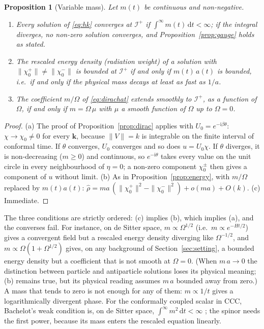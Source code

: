 \documentclass[11pt,a4paper]{article}
\newtheorem{proposition}{Proposition}
\theoremstyle{definition}
\newcommand{\scri}{\mathscr{I}^{+}}
\newcommand{\dd}{\mathrm{d}}
\newcommand{\ii}{\mathrm{i}}
\begin{document}
\begin{proposition}[Variable mass]
\label{prop:varmass}
Let $m(t)$ be continuous and non-negative.
\begin{enumerate}[label=(\alph*)]
\item Every solution of \eqref{eq:hk} converges at $\scri$ if $\int^{\infty}m(t)\,\dd t<\infty$; if the integral diverges, no non-zero solution converges, and Proposition~\ref{prop:gauge} holds as stated.
\item The rescaled energy density (radiation weight) of a solution with $\|\chi_{0}^{+}\|\neq\|\chi_{0}^{-}\|$ is bounded at $\scri$ if and only if $m(t)\,a(t)$ is bounded, i.e.\ if and only if the physical mass decays at least as fast as $1/a$.
\item The coefficient $m/\Omega$ of \eqref{eq:dirachat} extends smoothly to $\scri$, as a function of $\Omega$, if and only if $m=\Omega\,\mu$ with $\mu$ a smooth function of $\Omega$ up to $\Omega=0$.
\end{enumerate}
\end{proposition}
\begin{proof}
(a) The proof of Proposition~\ref{prop:dirac} applies with $U_{0}=e^{-\ii\beta\theta}$: $\chi\to\chi_{0}\neq0$ for every $\mathbf{k}$, because $\|V\|=k$ is integrable on the finite interval of conformal time. If $\theta$ converges, $U_{0}$ converges and so does $u=U_{0}\chi$. If $\theta$ diverges, it is non-decreasing ($m\geq0$) and continuous, so $e^{-\ii\theta}$ takes every value on the unit circle in every neighbourhood of $\eta=0$; a non-zero component $\chi_{0}^{\pm}$ then gives a component of $u$ without limit. (b) As in Proposition~\ref{prop:energy}, with $m/\Omega$ replaced by $m(t)a(t)$: $\hat\rho=m a\,(\|\chi_{0}^{+}\|^{2}-\|\chi_{0}^{-}\|^{2})+o(m a)+O(k)$. (c) Immediate.
\end{proof}

The three conditions are strictly ordered: (c) implies (b), which implies (a), and the converses fail. For instance, on de Sitter space, $m\propto\Omega^{1/2}$ (i.e.\ $m\propto e^{-Ht/2}$) gives a convergent field but a rescaled energy density diverging like $\Omega^{-1/2}$, and $m\propto\Omega(1+\Omega^{1/2})$ gives, on any background of Section~\ref{sec:setting}, a bounded energy density but a coefficient that is not smooth at $\Omega=0$. (When $m\,a\to0$ the distinction between particle and antiparticle solutions loses its physical meaning; (b) remains true, but its physical reading assumes $m\,a$ bounded away from zero.) A mass that tends to zero is not enough for any of them: $m\propto1/t$ gives a logarithmically divergent phase. For the conformally coupled scalar in CCC, Bachelot's weak condition is, on de Sitter space, $\int^{\infty}m^{2}\,\dd t<\infty$ \cite{Bachelot2020}; the spinor needs the first power, because its mass enters the rescaled equation linearly.
\end{document}
